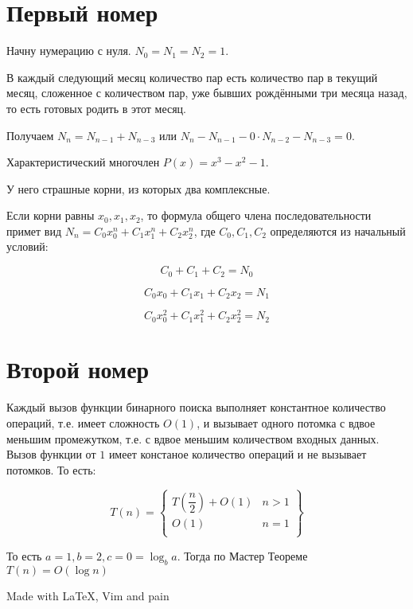 \documentclass[a4paper,12pt]{article}
\begin{document}
\begin{flushleft}
\section{Первый номер}
	Начну нумерацию с нуля. $N_0 = N_1 = N_2 = 1$.

	В каждый следующий месяц количество пар есть количество пар в текущий месяц, сложенное с количеством пар, уже бывших рождёнными три месяца назад, то есть готовых родить в этот месяц.

	Получаем $N_n = N_{n-1} + N_{n-3}$ или $N_n - N_{n-1} - 0 \cdot N_{n - 2} - N_{n-3} = 0$.

	Характеристический многочлен $P(x) = x^3 - x^2 - 1$.
	
	У него страшные корни, из которых два комплексные.

	Если корни равны $x_0, x_1, x_2$, то формула общего члена последовательности примет вид $N_n = C_0 x_0 ^ n + C_1 x_1 ^ n + C_2 x_2 ^ n$, где $C_0, C_1, C_2$ определяются из начальный условий:

	$$C_0 + C_1 + C_2 = N_0$$

	$$C_0 x_0 + C_1 x_1 + C_2 x_2 = N_1$$

	$$C_0 x_0^2 + C_1 x_1^2 + C_2 x_2^2 = N_2$$
\section{Второй номер}
	Каждый вызов функции бинарного поиска выполняет константное количество операций, т.е. имеет сложность $O(1)$, и вызывает одного потомка с вдвое меньшим промежутком, т.е. с вдвое меньшим количеством входных данных. Вызов функции от $1$ имеет констаное количество операций и не вызывает потомков. То есть:

	$$ T(n) = \left\{ 
	\begin{array}{ll}
		T \left( \dfrac{n}{2} \right) + O(1) & n > 1 \\
		O(1) & n = 1 \\
	\end{array}
	\right\} $$

	То есть $a=1, b=2, c=0=\log_b{a}$. Тогда по Мастер Теореме $T(n)=O(\log{n})$
\end{flushleft}
\begin{center}
Made with \LaTeX{}, Vim and pain
\end{center}
\end{document}

